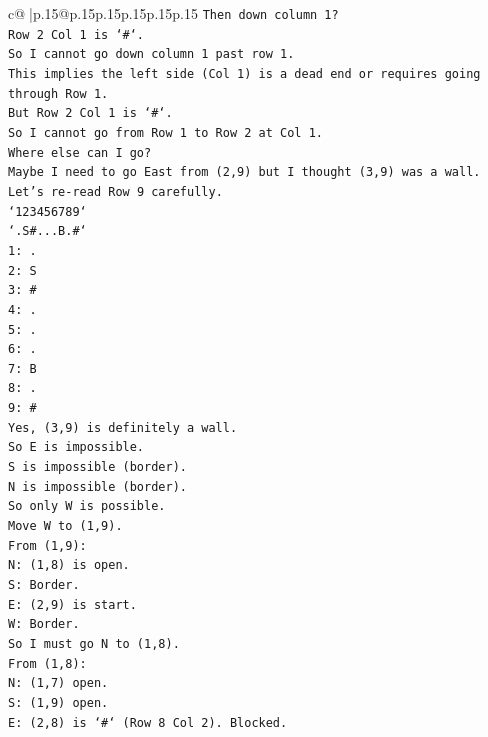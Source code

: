 \documentclass{article}
\begin{document}
{\begin{supertabular}{c@{$\;$}|p{.15\linewidth}@{}p{.15\linewidth}p{.15\linewidth}p{.15\linewidth}p{.15\linewidth}p{.15\linewidth}}
{{{\texttt{Then down column 1?} \\
\texttt{Row 2 Col 1 is `\#`.} \\
\texttt{So I cannot go down column 1 past row 1.} \\
\texttt{This implies the left side (Col 1) is a dead end or requires going through Row 1.} \\
\texttt{But Row 2 Col 1 is `\#`.} \\
\texttt{So I cannot go from Row 1 to Row 2 at Col 1.} \\
\texttt{Where else can I go?} \\
\texttt{Maybe I need to go East from (2,9) but I thought (3,9) was a wall.} \\
\texttt{Let's re{-}read Row 9 carefully.} \\
\texttt{`123456789`} \\
\texttt{`.S\#...B.\#`} \\
\texttt{1: .} \\
\texttt{2: S} \\
\texttt{3: \#} \\
\texttt{4: .} \\
\texttt{5: .} \\
\texttt{6: .} \\
\texttt{7: B} \\
\texttt{8: .} \\
\texttt{9: \#} \\
\texttt{Yes, (3,9) is definitely a wall.} \\
\texttt{So E is impossible.} \\
\texttt{S is impossible (border).} \\
\texttt{N is impossible (border).} \\
\texttt{So only W is possible.} \\
\texttt{Move W to (1,9).} \\
\texttt{From (1,9):} \\
\texttt{N: (1,8) is open.} \\
\texttt{S: Border.} \\
\texttt{E: (2,9) is start.} \\
\texttt{W: Border.} \\
\texttt{So I must go N to (1,8).} \\
\texttt{From (1,8):} \\
\texttt{N: (1,7) open.} \\
\texttt{S: (1,9) open.} \\
\texttt{E: (2,8) is `\#` (Row 8 Col 2). Blocked.} \\
}}}
\end{supertabular}}
\end{document}
